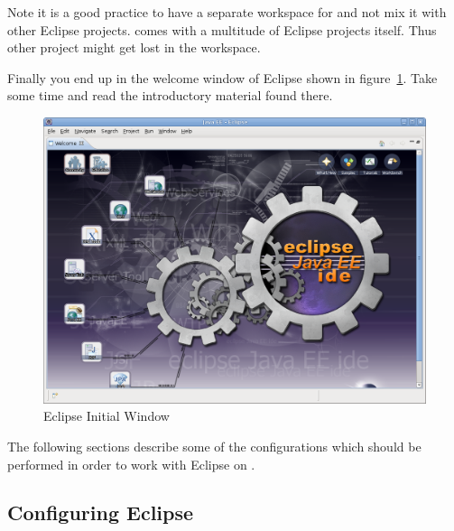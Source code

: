 Note it is a good practice to have a separate workspace for \ExTeX{}
and not mix it with other Eclipse projects. \ExTeX{} comes with a
multitude of Eclipse projects itself. Thus other project might get
lost in the workspace.

Finally you end up in the welcome window of Eclipse shown in
figure~\ref{fig:eclipse-welcome}. Take some time and read the
introductory material found there.
\begin{figure}[ht]
  \centering  \includegraphics[scale=.33]{image/eclipse/welcome}
  \caption{Eclipse Initial Window}\label{fig:eclipse-welcome}
\end{figure}

The following sections describe some of the configurations which
should be performed in order to work with Eclipse on \ExTeX.

\subsection{Configuring Eclipse}

